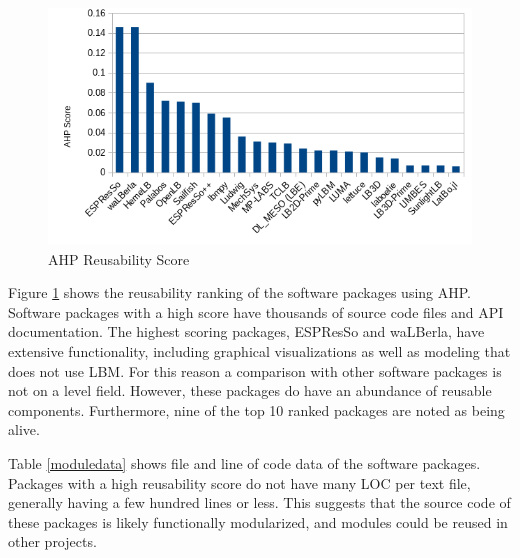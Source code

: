 \documentclass[12pt, notitlepage]{article}
\begin{document}
\begin{figure}[h!]
	\begin{center}
		\includegraphics[width=1.0\textwidth]{reusability_chart}
		\caption{AHP Reusability Score}
		\label{Fig_Reusabilty}
	\end{center}
\end{figure}

Figure \ref{Fig_Reusabilty} shows the reusability ranking of the software packages using AHP. Software packages with a high score have thousands of source code files and API documentation. The highest scoring packages, ESPResSo and waLBerla, have extensive functionality, including graphical visualizations as well as modeling that does not use LBM. For this reason a comparison with other software packages is not on a level field. However, these packages do have an abundance of reusable components. Furthermore, nine of the top 10 ranked packages are noted as being alive.

Table \ref{moduledata} shows file and line of code data of the software packages. Packages with a high reusability score do not have many LOC per text file, generally having a few hundred lines or less. This suggests that the source code of these packages is likely functionally modularized, and modules could be reused in other projects.\\  
\end{document}
